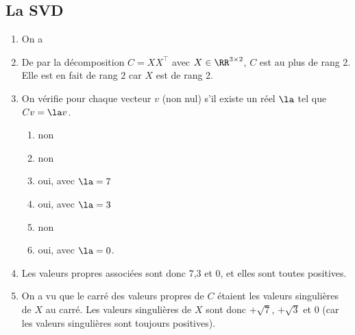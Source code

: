 \documentclass{article}
\begin{document}
\subsection{La SVD}

\begin{enumerate}
	\item On a
	
	\item De par la décomposition $C=XX^\top$ avec $X \in \RR^{3\times 2}$, $C$ est au plus de rang 2. Elle est en fait de rang 2 car $X$ est de rang 2.
	
	\item On vérifie pour chaque vecteur $v$ (non nul) s'il existe un réel $\la$ tel que $C v = \la v$.
	\begin{enumerate}
		\item non
		\item non
		\item oui, avec $\la=7$
		\item oui, avec $\la=3$
		\item non
		\item oui, avec $\la=0$.
	\end{enumerate}

	\item Les valeurs propres associées sont donc $7$,$3$ et $0$, et elles sont toutes positives.
	
	\item On a vu que le carré des valeurs propres de $C$ étaient les valeurs singulières de $X$ au carré. Les valeurs singulières de $X$ sont donc $+\sqrt{7}$, $+\sqrt{3}$ et $0$ (car les valeurs singulières sont toujours positives).
	

\end{enumerate}
\end{document}
